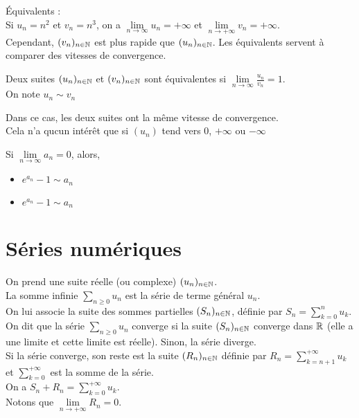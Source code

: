 \documentclass[../main.tex]{subfile}
\begin{document}
	\'Equivalents : \\
	Si $u_n = n^2$ et $v_n = n^3$, on a $\lim\limits_{n \to \infty} u_n = + \infty$ et $\lim\limits_{n \to + \infty} v_n = + \infty$.\\
	Cependant, $(v_n)_{n\in \mathbb{N}}$ est plus rapide que $(u_n)_{n\in \mathbb{N}}$. Les équivalents servent à comparer des vitesses de convergence.\\

\begin{defi}
	Deux suites $(u_n)_{n\in \mathbb{N}}$ et $(v_n)_{n \in \mathbb{N}}$ sont équivalentes si $\lim\limits_{n \to \infty} \frac{u_n}{v_n} = 1$.\\
	On note $u_n \sim v_n$
\end{defi}

Dans ce cas, les deux suites ont la même vitesse de convergence.\\
Cela n'a qucun intérêt que si $(u_n)$ tend vers $0$, $+\infty$ ou $-\infty$\\

\begin{ex}
	Si $\lim\limits_{n \to \infty} a_n = 0$, alors, \\
\begin{itemize}
	\item $e^{a_n} -1 \sim a_n$
	\item $e^{a_n} -1 \sim a_n$
\end{itemize}
\end{ex}

\part{Séries numériques}
On prend une suite réelle (ou complexe) $(u_n)_{n \in \mathbb{N}}$.\\
La somme infinie $\sum\limits_{n \geq 0} u_n$ est la série de terme général $u_n$.\\

On lui associe la suite des sommes partielles $(S_n)_{n \in \mathbb{N}}$, définie par $S_n = \sum\limits_{k = 0}^n u_k$.\\
On dit que la série $\sum\limits_{n \geq 0} u_n$ converge si la suite $(S_n)_{n \in \mathbb{N}}$ converge dans $\mathbb{R}$ (elle a une limite et cette limite est réelle). 
Sinon, la série diverge.\\

Si la série converge, son reste est la suite $(R_n)_{n \in \mathbb{N}}$ définie par $R_n = \sum\limits_{k = n+1}^{+\infty} u_k$ et $\sum\limits_{k = 0}^{+\infty}$ est la somme de la série.\\
On a $S_n + R_n = \sum\limits_{k=0}^{+\infty} u_k$.\\
Notons que $\lim\limits_{n \to +\infty} R_n = 0$.
\end{document}
